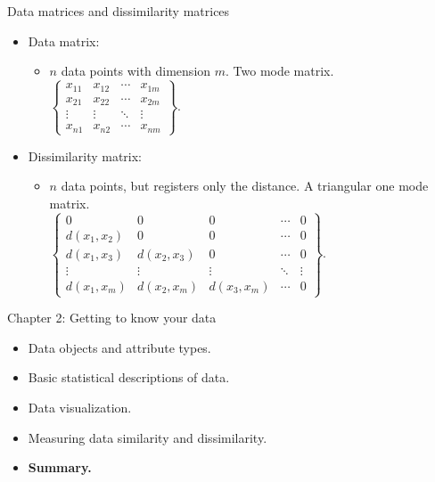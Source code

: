 \documentclass[aspectratio=169,t]{beamer}
\begin{document}
  { 
    \begin{frame}{Data matrices and dissimilarity matrices}
    \centering
    \begin{itemize}
      \item Data matrix:
      \begin{itemize}
        \item $n$ data points with dimension $m$. Two mode matrix.\\
              {$\begin{Bmatrix}
              x_{11} & x_{12} & \cdots & x_{1m}\\
              x_{21} & x_{22} & \cdots & x_{2m}\\
              \vdots & \vdots & \ddots & \vdots\\
              x_{n1} & x_{n2} & \cdots & x_{nm}
              \end{Bmatrix}$.}
      \end{itemize}
      \item Dissimilarity matrix:
      \begin{itemize}
        \item $n$ data points, but registers only the distance. A triangular one mode matrix.\\
              {$\begin{Bmatrix}
              0 & 0 & 0 & \cdots & 0\\
              d(x_{1},x_{2}) & 0 & 0 & \cdots & 0\\
              d(x_{1},x_{3}) & d(x_{2},x_{3}) & 0 & \cdots & 0\\
              \vdots & \vdots & \vdots &\ddots & \vdots\\
              d(x_{1},x_{m}) & d(x_{2},x_{m}) & d(x_{3},x_{m}) & \cdots & 0
              \end{Bmatrix}$.}
      \end{itemize}
    \end{itemize}
    
    \end{frame}
  }

  { 
    \begin{frame}{Chapter 2: Getting to know your data}
    \centering
    \begin{itemize}
        \item Data objects and attribute types.
        \item Basic statistical descriptions of data.
        \item Data visualization.
        \item Measuring data similarity and dissimilarity.
        \item \textbf{Summary.}
    \end{itemize}
    \end{frame}
  }
\end{document}
